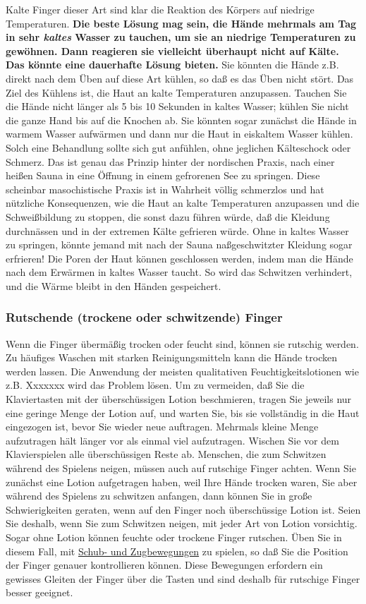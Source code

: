 Kalte Finger dieser Art sind klar die Reaktion des Körpers auf niedrige Temperaturen.
\textbf{Die beste Lösung mag sein, die Hände mehrmals am Tag in sehr \textit{kaltes} Wasser zu tauchen, um sie an niedrige Temperaturen zu gewöhnen.
Dann reagieren sie vielleicht überhaupt nicht auf Kälte.
Das könnte eine dauerhafte Lösung bieten.}
Sie könnten die Hände z.B. direkt nach dem Üben auf diese Art kühlen, so daß es das Üben nicht stört.
Das Ziel des Kühlens ist, die Haut an kalte Temperaturen anzupassen.
Tauchen Sie die Hände nicht länger als 5 bis 10 Sekunden in kaltes Wasser; kühlen Sie nicht die ganze Hand bis auf die Knochen ab.
Sie könnten sogar zunächst die Hände in warmem Wasser aufwärmen und dann nur die Haut in eiskaltem Wasser kühlen.
Solch eine Behandlung sollte sich gut anfühlen, ohne jeglichen Kälteschock oder Schmerz.
Das ist genau das Prinzip hinter der nordischen Praxis, nach einer heißen Sauna in eine Öffnung in einem gefrorenen See zu springen.
Diese scheinbar masochistische Praxis ist in Wahrheit völlig schmerzlos und hat nützliche Konsequenzen, wie die Haut an kalte Temperaturen anzupassen und die Schweißbildung zu stoppen, die sonst dazu führen würde, daß die Kleidung durchnässen und in der extremen Kälte gefrieren würde.
Ohne in kaltes Wasser zu springen, könnte jemand mit nach der Sauna naßgeschwitzter Kleidung sogar erfrieren!
Die Poren der Haut können geschlossen werden, indem man die Hände nach dem Erwärmen in kaltes Wasser taucht.
So wird das Schwitzen verhindert, und die Wärme bleibt in den Händen gespeichert.
 

\subsubsection{Rutschende (trockene oder schwitzende) Finger}
\label{c1iii10rutschen}

Wenn die Finger übermäßig trocken oder feucht sind, können sie rutschig werden.
Zu häufiges Waschen mit starken Reinigungsmitteln kann die Hände trocken werden lassen.
Die Anwendung der meisten qualitativen Feuchtigkeitslotionen wie z.B. Xxxxxxx wird das Problem lösen.
Um zu vermeiden, daß Sie die Klaviertasten mit der überschüssigen Lotion beschmieren, tragen Sie jeweils nur eine geringe Menge der Lotion auf, und warten Sie, bis sie vollständig in die Haut eingezogen ist, bevor Sie wieder neue auftragen.
Mehrmals kleine Menge aufzutragen hält länger vor als einmal viel aufzutragen.
Wischen Sie vor dem Klavierspielen alle überschüssigen Reste ab.
Menschen, die zum Schwitzen während des Spielens neigen, müssen auch auf rutschige Finger achten.
Wenn Sie zunächst eine Lotion aufgetragen haben, weil Ihre Hände trocken waren, Sie aber während des Spielens zu schwitzen  anfangen, dann können Sie in große Schwierigkeiten geraten, wenn auf den Finger noch überschüssige Lotion ist.
Seien Sie deshalb, wenn Sie zum Schwitzen neigen, mit jeder Art von Lotion vorsichtig.
Sogar ohne Lotion können feuchte oder trockene Finger rutschen.
Üben Sie in diesem Fall, mit \hyperref[c1iii4SchubZug]{Schub- und Zugbewegungen} zu spielen, so daß Sie die Position der Finger genauer kontrollieren können.
Diese Bewegungen erfordern ein gewisses Gleiten der Finger über die Tasten und sind deshalb für rutschige Finger besser geeignet.


